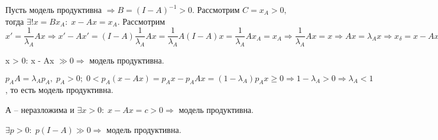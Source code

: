 \begin{Proof}
\begin{description}
		\item \fbox{$\Rightarrow$} Пусть модель продуктивна $ \Rightarrow B = (I - A)^{-1} > 0. $ Рассмотрим $C = x_A > 0,$ тогда $\exists ! x = Bx_A: \; x - Ax = x_A.$ Рассмотрим $x' = \dfrac{1}{\lambda_A}Ax \Rightarrow x' - Ax' = (I - A)\dfrac{1}{\lambda_A}Ax = \dfrac{1}{\lambda_A}A(I - A)x = \dfrac{1}{\lambda_A}Ax_A = x_A \Rightarrow \dfrac{1}{\lambda_A}Ax = x \Rightarrow Ax = \lambda_A x \Rightarrow x_{\delta} = x - Ax = (1 - \lambda_A)x. \; x_{\delta} > 0, \; x > 0 \Rightarrow 1 - \lambda_A > 0 \Rightarrow \lambda_A < 1.$
	\end{description}
\end{Proof}

\begin{clair}
	x > 0: x - Ax $\gg 0 \Rightarrow$ модель продуктивна.
\end{clair}

\begin{Proof}
	$p_A A = \lambda_A p_A, \; p_A > 0; \; 0 < p_A(x - Ax) = p_A x - p_A A x = (1 - \lambda_A)p_A x \geq 0 \Rightarrow 1 - \lambda_A > 0 \Rightarrow \lambda_A < 1$, то есть модель продуктивна.
\end{Proof}

\begin{clair}
	А -- неразложима и $\exists x > 0: \; x - Ax = c > 0 \Rightarrow $ модель продуктивна.
\end{clair}

\begin{clair}
	$\exists p > 0: \; p(I - A) \gg 0 \Rightarrow $ модель продуктивна.
\end{clair}